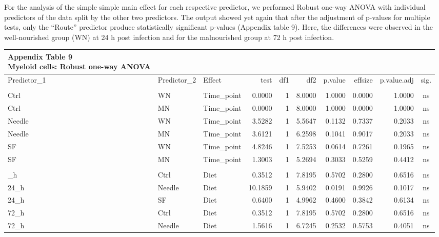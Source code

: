 \documentclass[
  12pt,
  letterpaper,
]{article}
\begin{document}
For the analysis of the simple simple main effect for each respective predictor, we performed Robust one-way ANOVA with individual predictors of the data split by the other two predictors. The output showed yet again that after the adjustment of p-values for multiple tests, only the ``Route'' predictor produce statistically significant p-values (Appendix table 9). Here, the differences were observed in the well-nourished group (WN) at 24 h post infection and for the malnourished group at 72 h post infection.

\begingroup
\fontsize{12.0pt}{14.4pt}\selectfont
\begin{longtable}{lllrrrrrrc}
\caption*{
{\large \textbf{Appendix Table 9}} \\ 
{\small \textbf{Myeloid cells: Robust one-way ANOVA}}
} \\ 
\toprule
Predictor\_1 & Predictor\_2 & {Effect} & {test} & {df1} & {df2} & {p.value} & {effsize} & {p.value.adj} & {sig.} \\ 
\midrule\addlinespace[2.5pt]
\multicolumn{10}{l}{Predictor: Time\_point} \\[2.5pt] 
\midrule\addlinespace[2.5pt]
Ctrl & WN & Time\_point & 0.0000 & 1 & 8.0000 & 1.0000 & 0.0000 & 1.0000 & ns \\ 
Ctrl & MN & Time\_point & 0.0000 & 1 & 8.0000 & 1.0000 & 0.0000 & 1.0000 & ns \\ 
Needle & WN & Time\_point & 3.5282 & 1 & 5.5647 & 0.1132 & 0.7337 & 0.2033 & ns \\ 
Needle & MN & Time\_point & 3.6121 & 1 & 6.2598 & 0.1041 & 0.9017 & 0.2033 & ns \\ 
SF & WN & Time\_point & 4.8246 & 1 & 7.5253 & 0.0614 & 0.7261 & 0.1965 & ns \\ 
SF & MN & Time\_point & 1.3003 & 1 & 5.2694 & 0.3033 & 0.5259 & 0.4412 & ns \\ 
\midrule\addlinespace[2.5pt]
\multicolumn{10}{l}{Predictor: Diet} \\[2.5pt] 
\midrule\addlinespace[2.5pt]
24\_h & Ctrl & Diet & 0.3512 & 1 & 7.8195 & 0.5702 & 0.2800 & 0.6516 & ns \\ 
24\_h & Needle & Diet & 10.1859 & 1 & 5.9402 & 0.0191 & 0.9926 & 0.1017 & ns \\ 
24\_h & SF & Diet & 0.6400 & 1 & 4.9962 & 0.4600 & 0.3842 & 0.6134 & ns \\ 
72\_h & Ctrl & Diet & 0.3512 & 1 & 7.8195 & 0.5702 & 0.2800 & 0.6516 & ns \\ 
72\_h & Needle & Diet & 1.5616 & 1 & 6.7245 & 0.2532 & 0.5753 & 0.4051 & ns \\ 

\end{longtable}
\end{document}
